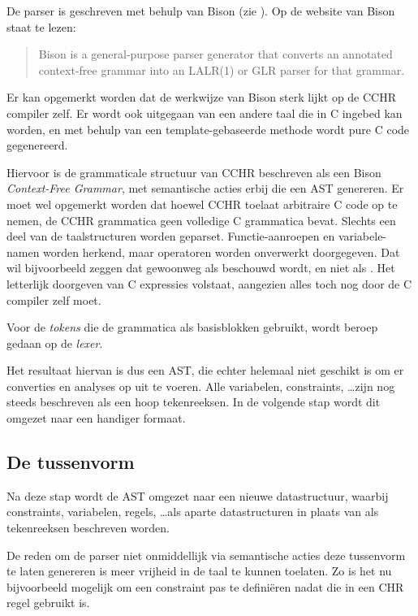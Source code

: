 De parser is geschreven met behulp van Bison (zie \cite{bison}). Op de website van Bison staat te lezen: \begin{quote}
  Bison is a general-purpose parser generator that converts an annotated context-free grammar into an LALR(1) or GLR parser for that grammar.
\end{quote}

Er kan opgemerkt worden dat de werkwijze van Bison sterk lijkt op de CCHR compiler zelf. Er wordt ook uitgegaan van een andere taal die in C ingebed kan worden, en met behulp van een template-gebaseerde methode wordt pure C code gegenereerd.

Hiervoor is de grammaticale structuur van CCHR beschreven als een Bison {\em Context-Free Grammar}, met semantische acties erbij die een AST genereren. Er moet wel opgemerkt worden dat hoewel CCHR toelaat arbitraire C code op te nemen, de CCHR grammatica geen volledige C grammatica bevat. Slechts een deel van de taalstructuren worden geparset. Functie-aanroepen en variabele-namen worden herkend, maar operatoren worden onverwerkt doorgegeven. Dat wil bijvoorbeeld zeggen dat  gewoonweg als  beschouwd wordt, en niet als . Het letterlijk doorgeven van C expressies volstaat, aangezien alles toch nog door de C compiler zelf moet.

Voor de {\em tokens} die de grammatica als basisblokken gebruikt, wordt beroep gedaan op de {\em lexer}.

Het resultaat hiervan is dus een AST, die echter helemaal niet geschikt is om er converties en analyses op uit te voeren. Alle variabelen, constraints, \ldots zijn nog steeds beschreven als een hoop tekenreeksen. In de volgende stap wordt dit omgezet naar een handiger formaat. 

\subsection{De tussenvorm} \label{sec:tussenvorm}

Na deze stap wordt de AST omgezet naar een nieuwe datastructuur, waarbij constraints, variabelen, regels, \ldots als aparte datastructuren in plaats van als tekenreeksen beschreven worden. 

De reden om de parser niet onmiddellijk via semantische acties deze tussenvorm te laten genereren is meer vrijheid in de taal te kunnen toelaten. Zo is het nu bijvoorbeeld mogelijk om een constraint pas te defini\"eren nadat die in een CHR regel gebruikt is.

